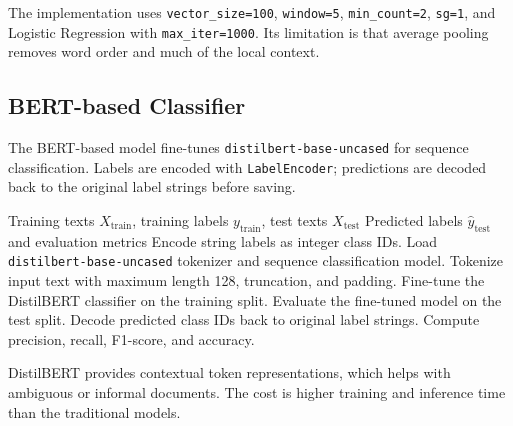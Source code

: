 The implementation uses \texttt{vector\_size=100}, \texttt{window=5}, \texttt{min\_count=2}, \texttt{sg=1}, and Logistic Regression with \texttt{max\_iter=1000}. Its limitation is that average pooling removes word order and much of the local context.

\subsection{BERT-based Classifier}

The BERT-based model fine-tunes \texttt{distilbert-base-uncased} for sequence classification. Labels are encoded with \texttt{LabelEncoder}; predictions are decoded back to the original label strings before saving.

\begin{algorithm}[H]
\caption{DistilBERT Fine-tuning for Document Topic Classification}
\label{alg:bert}
\begin{algorithmic}[1]
\Require Training texts $X_{\text{train}}$, training labels $y_{\text{train}}$, test texts $X_{\text{test}}$
\Ensure Predicted labels $\hat{y}_{\text{test}}$ and evaluation metrics
\State Encode string labels as integer class IDs.
\State Load \texttt{distilbert-base-uncased} tokenizer and sequence classification model.
\State Tokenize input text with maximum length 128, truncation, and padding.
\State Fine-tune the DistilBERT classifier on the training split.
\State Evaluate the fine-tuned model on the test split.
\State Decode predicted class IDs back to original label strings.
\State Compute precision, recall, F1-score, and accuracy.
\end{algorithmic}
\end{algorithm}

DistilBERT provides contextual token representations, which helps with ambiguous or informal documents. The cost is higher training and inference time than the traditional models.

